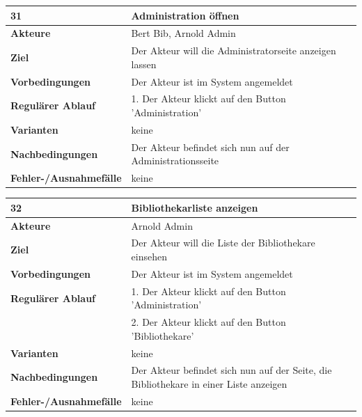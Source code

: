 \documentclass[fontsize=12pt,paper=a4,twoside]{scrartcl}
\begin{document}
\begin{table}[htbp]
\label{31}
\begin{tabular}{|l|p{10cm}|}
\hline 
\textbf{31} & \textbf{Administration öffnen} \\ \hline
\textbf{Akteure} & Bert Bib, Arnold Admin\\ \hline
\textbf{Ziel} & Der Akteur will die Administratorseite anzeigen lassen \\ \hline
\textbf{Vorbedingungen} & Der Akteur ist im System angemeldet \\ \hline
\textbf{Regulärer Ablauf} & 
1. Der Akteur klickt auf den Button 'Administration' \\
\hline
\textbf{Varianten} & 
keine \\ \hline
\textbf{Nachbedingungen} & Der Akteur befindet sich nun auf der Administrationsseite\\ \hline
\textbf{Fehler-/Ausnahmefälle} & keine\\
\hline
\end{tabular}
\end{table}

\newpage

\begin{table}[htbp]
\label{32}
\begin{tabular}{|l|p{10cm}|}
\hline 
\textbf{32} & \textbf{Bibliothekarliste anzeigen} \\ \hline
\textbf{Akteure} & Arnold Admin\\ \hline
\textbf{Ziel} & Der Akteur will die Liste der Bibliothekare einsehen \\ \hline
\textbf{Vorbedingungen} & Der Akteur ist im System angemeldet \\ \hline
\textbf{Regulärer Ablauf} & 
1. Der Akteur klickt auf den Button 'Administration' \\
&2. Der Akteur klickt auf den Button 'Bibliothekare'\\
\hline
\textbf{Varianten} & 
keine \\ \hline
\textbf{Nachbedingungen} & Der Akteur befindet sich nun auf der Seite, die Bibliothekare in einer 
Liste anzeigen\\ \hline
\textbf{Fehler-/Ausnahmefälle} & keine\\
\hline
\end{tabular}
\end{table}
\end{document}
